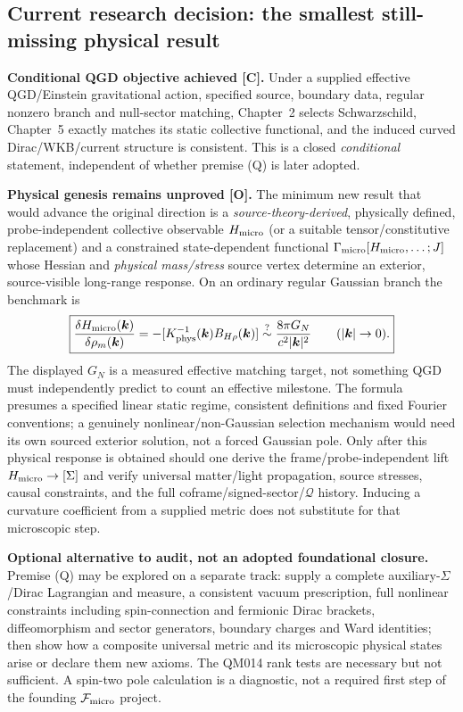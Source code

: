 \documentclass[11pt,a4paper]{article}
\begin{document}
\subsection{Current research decision: the smallest still-missing physical result}\label{sec:v08-decision}
\textbf{Conditional QGD objective achieved [C].} Under a supplied effective QGD/Einstein gravitational action, specified source, boundary data, regular nonzero branch and null-sector matching, Chapter~2 selects Schwarzschild, Chapter~5 exactly matches its static collective functional, and the induced curved Dirac/WKB/current structure is consistent. This is a closed \emph{conditional} statement, independent of whether premise (Q) is later adopted.

\textbf{Physical genesis remains unproved [O].} The minimum new result that would advance the original direction is a \emph{source-theory-derived}, physically defined, probe-independent collective observable $H_{\rm micro}$ (or a suitable tensor/constitutive replacement) and a constrained state-dependent functional $\Gamma_{\rm micro}[H_{\rm micro},\ldots;J]$ whose Hessian and \emph{physical mass/stress} source vertex determine an exterior, source-visible long-range response. On an ordinary regular Gaussian branch the benchmark is
\begin{equation}\label{eq:v08-micro-target}
\boxed{\frac{\delta H_{\rm micro}(\bm k)}{\delta\rho_m(\bm k)}
=-[K_{\rm phys}^{-1}(\bm k)B_{H\rho}(\bm k)]
\stackrel{?}{\sim}\frac{8\pi G_N}{c^2|\bm k|^2}
\qquad(|\bm k|\to0).}
\end{equation}
The displayed $G_N$ is a measured effective matching target, not something QGD must independently predict to count an effective milestone. The formula presumes a specified linear static regime, consistent definitions and fixed Fourier conventions; a genuinely nonlinear/non-Gaussian selection mechanism would need its own sourced exterior solution, not a forced Gaussian pole. Only after this physical response is obtained should one derive the frame/probe-independent lift $H_{\rm micro}\to[\Sigma]$ and verify universal matter/light propagation, source stresses, causal constraints, and the full coframe/signed-sector/$\mathcal Q$ history. Inducing a curvature coefficient from a supplied metric does not substitute for that microscopic step.

\textbf{Optional alternative to audit, not an adopted foundational closure.} Premise (Q) may be explored on a separate track: supply a complete auxiliary-$\Sigma$/Dirac Lagrangian and measure, a consistent vacuum prescription, full nonlinear constraints including spin-connection and fermionic Dirac brackets, diffeomorphism and sector generators, boundary charges and Ward identities; then show how a composite universal metric and its microscopic physical states arise or declare them new axioms. The QM014 rank tests are necessary but not sufficient. A spin-two pole calculation is a diagnostic, not a required first step of the founding $\mathcal F_{\rm micro}$ project.
\end{document}
